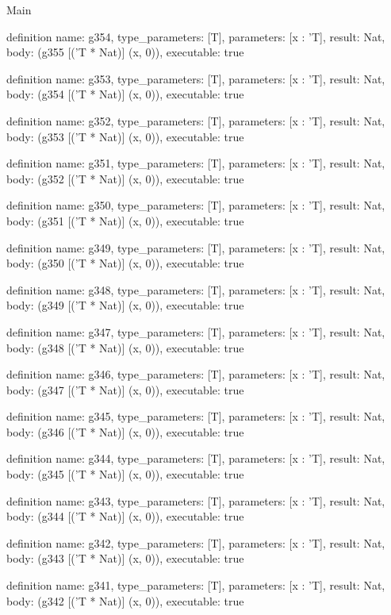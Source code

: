 \begin{lexlean}{Main}
\begin{semanticmodule}
definition{
  name: g354,
  type_parameters: [T],
  parameters: [x : 'T],
  result: Nat,
  body: (g355 [('T * Nat)] (x, 0)),
  executable: true
}

definition{
  name: g353,
  type_parameters: [T],
  parameters: [x : 'T],
  result: Nat,
  body: (g354 [('T * Nat)] (x, 0)),
  executable: true
}

definition{
  name: g352,
  type_parameters: [T],
  parameters: [x : 'T],
  result: Nat,
  body: (g353 [('T * Nat)] (x, 0)),
  executable: true
}

definition{
  name: g351,
  type_parameters: [T],
  parameters: [x : 'T],
  result: Nat,
  body: (g352 [('T * Nat)] (x, 0)),
  executable: true
}

definition{
  name: g350,
  type_parameters: [T],
  parameters: [x : 'T],
  result: Nat,
  body: (g351 [('T * Nat)] (x, 0)),
  executable: true
}

definition{
  name: g349,
  type_parameters: [T],
  parameters: [x : 'T],
  result: Nat,
  body: (g350 [('T * Nat)] (x, 0)),
  executable: true
}

definition{
  name: g348,
  type_parameters: [T],
  parameters: [x : 'T],
  result: Nat,
  body: (g349 [('T * Nat)] (x, 0)),
  executable: true
}

definition{
  name: g347,
  type_parameters: [T],
  parameters: [x : 'T],
  result: Nat,
  body: (g348 [('T * Nat)] (x, 0)),
  executable: true
}

definition{
  name: g346,
  type_parameters: [T],
  parameters: [x : 'T],
  result: Nat,
  body: (g347 [('T * Nat)] (x, 0)),
  executable: true
}

definition{
  name: g345,
  type_parameters: [T],
  parameters: [x : 'T],
  result: Nat,
  body: (g346 [('T * Nat)] (x, 0)),
  executable: true
}

definition{
  name: g344,
  type_parameters: [T],
  parameters: [x : 'T],
  result: Nat,
  body: (g345 [('T * Nat)] (x, 0)),
  executable: true
}

definition{
  name: g343,
  type_parameters: [T],
  parameters: [x : 'T],
  result: Nat,
  body: (g344 [('T * Nat)] (x, 0)),
  executable: true
}

definition{
  name: g342,
  type_parameters: [T],
  parameters: [x : 'T],
  result: Nat,
  body: (g343 [('T * Nat)] (x, 0)),
  executable: true
}

definition{
  name: g341,
  type_parameters: [T],
  parameters: [x : 'T],
  result: Nat,
  body: (g342 [('T * Nat)] (x, 0)),
  executable: true
}


\end{semanticmodule}
\end{lexlean}
